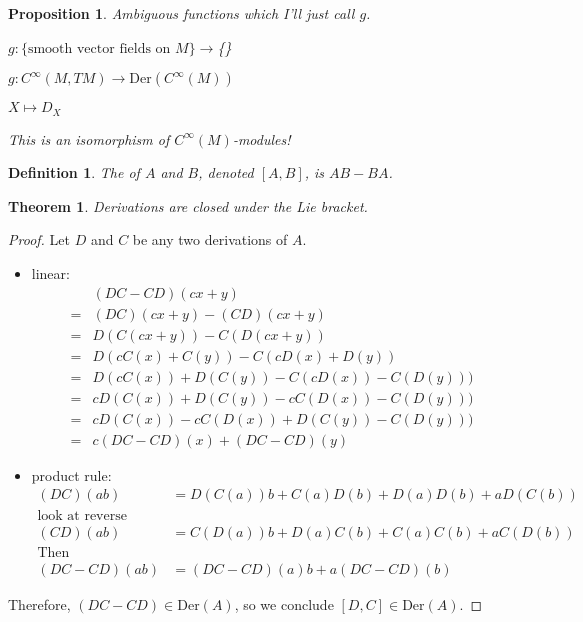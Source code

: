 \documentclass[11pt]{amsbook}
\theoremstyle{mystyle} %
\newtheorem{thrm}[thm]{Theorem}
\newtheorem{defi}[thm]{Definition}
\newtheorem{propo}[thm]{Proposition}
\numberwithin{thm}{section}
\newcommand{\Der}{\text{Der}}
\begin{document}
\begin{propo}
	Ambiguous functions which I'll just call $g$.

	$g : \{\text{smooth vector fields on $M$}\} \to $\{\}

	$g : C^\infty(M,TM) \to \Der(C^\infty(M))$

	$X \mapsto D_X$

	This is an isomorphism of $C^\infty(M)$-modules!
\end{propo}


\begin{defi}
	The  of $A$ and $B$, denoted $[A,B]$, is $AB - BA$.
\end{defi}
\begin{thrm}
	Derivations are closed under the Lie bracket.
\end{thrm}
\begin{proof}
	Let $D$ and $C$ be any two derivations of $A$.
	\begin{itemize}
		\item linear:
		\begin{align}
			& (DC - CD)(cx + y) \\
			=& (DC)(cx + y) - (CD)(cx + y) \\
			=& D(C(cx + y)) - C(D(cx + y)) \\
			=& D(cC(x) + C(y)) - C(cD(x) + D(y)) \\
			=& D(cC(x)) + D(C(y)) - C(cD(x)) - C(D(y))) \\
			=& cD(C(x)) + D(C(y)) - cC(D(x)) - C(D(y))) \\
			=& cD(C(x)) - cC(D(x))+  D(C(y)) - C(D(y))) \\
			=& c(DC-CD)(x)      +    (DC-CD)(y)
		\end{align}
		\item product rule:
		\begin{align}
			(DC)(ab) &= D(C(a))b + C(a)D(b) + D(a)D(b) + aD(C(b)) \\
			\text{look at reverse} \\
			(CD)(ab) &= C(D(a))b + D(a)C(b) + C(a)C(b) + aC(D(b)) \\
			\text{Then} \\
			(DC - CD)(ab) &= (DC - CD)(a)b + a(DC - CD)(b)
		\end{align}
	\end{itemize}
	Therefore,  $(DC - CD) \in \Der(A)$, so we conclude $[D,C] \in \Der(A)$.
\end{proof}
\end{document}
